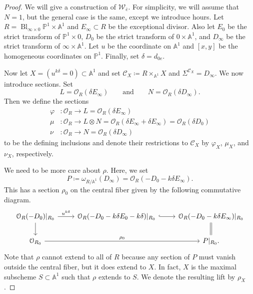\documentclass{amsart}
\theoremstyle{definition}
\theoremstyle{remark}
\theoremstyle{plain}
\theoremstyle{definition}
\theoremstyle{remark}
\newcommand{\A}{\mathbb{A}}
\renewcommand{\P}{\mathbb{P}}
\newcommand{\mc}[1]{\mathcal{#1}}
\newcommand{\1}{\mathbf{1}}
\newcommand{\2}{\mathbf{2}}
\newcommand{\3}{\mathbf{3}}
\DeclareMathOperator{\Bl}{Bl}
\begin{document}
\begin{proof}
    We will give a construction of $\mc{W}_{\bar{e}}$. For simplicity, we will assume that $N=1$, but the general case is the same, except we introduce hours. Let $R = \Bl_{\infty \times 0} \P^1 \times \A^1$ and $E_{\infty} \subset R$ be the exceptional divisor. Also let $E_0$ be the strict transform of $\P^1 \times 0$, $D_0$ be the strict transform of $0 \times \A^1$, and $D_{\infty}$ be the strict transform of $\infty \times \A^1$. Let $u$ be the coordinate on $\A^1$ and $[x,y]$ be the homogeneous coordinates on $\P^1$. Finally, set $\delta = d_{0e}$.

    Now let $X = (u^{k\delta} = 0) \subset \A^1$ and set $\mc{C}_X \coloneqq R \times_{\A^1} X$ and $\Sigma^{\mc{C}_X} = D_{\infty}$. We now introduce sections. Set
    \[ L = \mc{O}_R(\delta E_{\infty}) \qquad \text{and} \qquad  N = \mc{O}_R(\delta D_{\infty}). \]
    Then we define the sections
    \begin{align*}
        \varphi &\colon \mc{O}_R \to L = \mc{O}_R(\delta E_{\infty}) \\
        \mu &\colon \mc{O}_R \to L \otimes N = \mc{O}_R(\delta E_{\infty} + \delta E_{\infty}) = \mc{O}_R(\delta D_0) \\
        \nu &\colon \mc{O}_R \to N = \mc{O}_R(\delta D_{\infty})
    \end{align*}
    to be the defining inclusions and denote their restrictions to $\mc{C}_X$ by $\varphi_X$, $\mu_X$, and $\nu_X$, respectively.

    We need to be more care about $\rho$. Here, we set
    \[ P \coloneqq \omega_{R/\A^1}(D_{\infty}) = \mc{O}_R(-D_0 - k\delta E_{\infty}). \]
    This has a section $\rho_0$ on the central fiber given by the following commutative diagram.
    \begin{equation*}
    \begin{tikzcd}
        \mc{O}_R(-D_0)|_{R_0} \ar{r}{u^{k\delta}} \ar{d} & \mc{O}_R(-D_0 - k\delta E_0 - k \delta)|_{R_0} \ar[hookrightarrow]{r} & \mc{O}_R(-D_0 - k\delta E_{\infty})|_{R_0} \ar[equal]{d} \\
        \mc{O}_{R_0} \ar{rr}{\rho_0} & & P|_{R_0}.
    \end{tikzcd}
    \end{equation*}
    Note that $\rho$ cannot extend to all of $R$ because any section of $P$ must vanish outside the central fiber, but it does extend to $X$. In fact, $X$ is the maximal subscheme $S \subset \A^1$ such that $\rho$ extends to $S$. We denote the resulting lift by $\rho_X$.


\end{proof}
\end{document}
